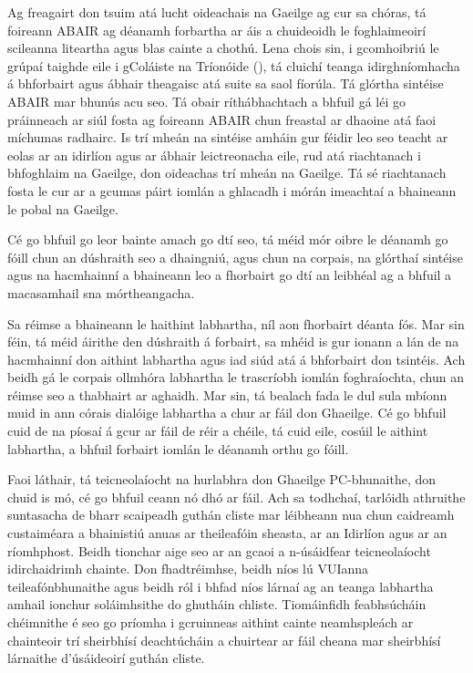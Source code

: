 \begin{multicols}{2}
Ag freagairt don tsuim atá lucht oideachais na Gaeilge ag cur sa chóras, tá foireann ABAIR ag déanamh forbartha ar áis a chuideoidh le foghlaimeoirí scileanna liteartha agus blas cainte a chothú. Lena chois sin, i gcomhoibriú le grúpaí taighde eile i gColáiste na Tríonóide (\cite {slate2011}), tá cluichí teanga idirghníomhacha á bhforbairt agus ábhair theagaisc atá suite sa saol fíorúla. Tá glórtha sintéise ABAIR mar bhunús acu seo. Tá obair ríthábhachtach a bhfuil gá léi go práinneach ar siúl fosta ag foireann ABAIR chun freastal ar dhaoine atá faoi míchumas radhairc. Is trí mheán na sintéise amháin gur féidir leo seo teacht ar eolas ar an idirlíon agus ar ábhair leictreonacha eile, rud atá riachtanach i bhfoghlaim na Gaeilge, don oideachas trí mheán na Gaeilge. Tá sé riachtanach fosta le cur ar a gcumas páirt iomlán a ghlacadh i mórán imeachtaí a bhaineann le pobal na Gaeilge.

Cé go bhfuil go leor bainte amach go dtí seo, tá méid mór oibre le déanamh go fóill chun an dúshraith seo a dhaingniú, agus chun na corpais, na glórthaí sintéise agus na hacmhainní a bhaineann leo a fhorbairt go dtí an leibhéal ag a bhfuil a macasamhail sna mórtheangacha.     

Sa réimse a bhaineann le haithint labhartha, níl aon fhorbairt déanta fós. Mar sin féin, tá méid áirithe den dúshraith á forbairt, sa mhéid is gur ionann a lán de na hacmhainní don aithint labhartha agus iad siúd atá á bhforbairt don tsintéis. Ach beidh gá le corpais ollmhóra labhartha le trascríobh iomlán foghraíochta, chun an réimse seo a thabhairt ar aghaidh. Mar sin, tá bealach fada le dul sula mbíonn muid in ann córais dialóige labhartha a chur ar fáil don Ghaeilge. Cé go bhfuil cuid de na píosaí á gcur ar fáil de réir a chéile, tá cuid eile, cosúil le aithint labhartha, a bhfuil forbairt iomlán le déanamh orthu go fóill.


Faoi láthair, tá teicneolaíocht na hurlabhra don Ghaeilge PC-bhunaithe, don chuid is mó, cé go bhfuil ceann nó dhó ar fáil. Ach sa todhchaí, tarlóidh athruithe suntasacha de bharr scaipeadh guthán cliste mar léibheann nua chun caidreamh custaiméara a bhainistiú anuas ar theileafóin sheasta, ar an Idirlíon agus ar an ríomhphost. Beidh tionchar aige seo ar an gcaoi a n-úsáidfear teicneolaíocht idirchaidrimh chainte. Don fhadtréimhse, beidh níos lú VUIanna teileafónbhunaithe agus beidh ról i bhfad níos lárnaí ag an teanga labhartha amhail ionchur soláimhsithe do ghutháin chliste. Tiomáinfidh feabhsúcháin chéimnithe é seo go príomha i gcruinneas aithint cainte neamhspleách ar chainteoir trí sheirbhísí deachtúcháin a chuirtear ar fáil cheana mar sheirbhísí lárnaithe d’úsáideoirí guthán cliste.



\end{multicols}
